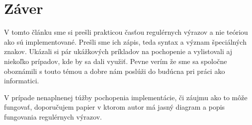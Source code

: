\documentclass[10pt,twoside,slovak,a4paper]{article}
\begin{document}
\section{Záver}
V tomto článku sme si prešli prakticou časťou regulérnych výrazov a nie teóriou ako sú implementované. Prešli sme ich zápis, teda syntax a význam špeciálných znakov.
Ukázali si pár ukážkových príkladov na pochopenie a vylistovali aj niekoľko prípadov, kde by sa dali využiť. Pevne verím že sme sa spoločne oboznámili s touto témou a dobre nám poslúži do budúcna pri práci ako informatici.

V prípade nenaplnenej túžby pochopenia implementácie, či záujmu ako to môže fungovať, doporučujem papier \cite{RegEx_Implementation} v ktorom autor má jasný diagram a popis fungovania regulérnych výrazov.

\clearpage



\end{document}
